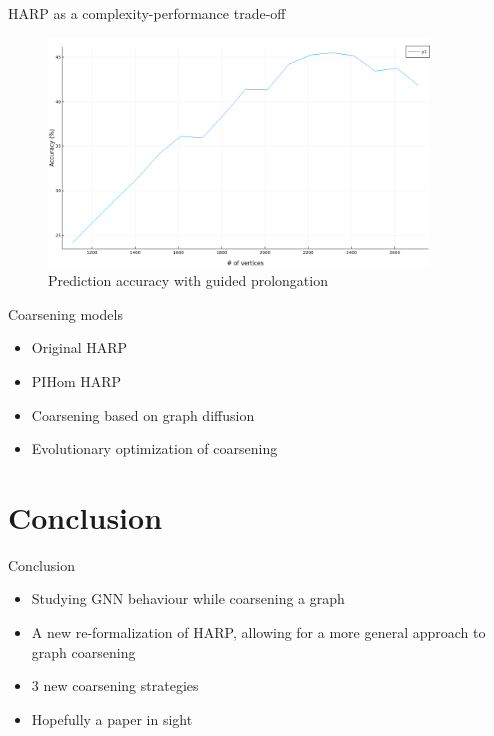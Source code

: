 \documentclass[10pt]{beamer}
\begin{document}
\begin{frame}{HARP as a complexity-performance trade-off}
	\begin{figure}
		\centering
		\includegraphics[width=0.9\textwidth]{images/accuracy-size.png}
		\caption{Prediction accuracy with guided prolongation}
	\end{figure}
\end{frame}

\begin{frame}{Coarsening models}
	\begin{itemize}
		\item Original HARP
		\item PIHom HARP
		\item Coarsening based on graph diffusion
		\item Evolutionary optimization of coarsening
	\end{itemize}
\end{frame}

\section{Conclusion}

\begin{frame}{Conclusion}
	\centering
	\begin{itemize}
		\item Studying GNN behaviour while coarsening a graph
		\item A new re-formalization of HARP, allowing for a more general approach to graph coarsening
		\item 3 new coarsening strategies
		\item Hopefully a paper in sight
	\end{itemize}
\end{frame}

\begin{frame}
	\titlepage
\end{frame}
\end{document}
